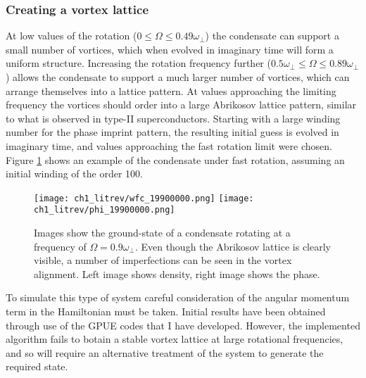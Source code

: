 \subsubsection{Creating a vortex lattice}
At low values of the rotation ($0 \leq \Omega \leq 0.49\omega_{\perp}$) the condensate can support a small number of vortices, which when evolved
in imaginary time will form a uniform structure. Increasing the rotation frequency further ($0.5\omega_{\perp} \leq \Omega \leq 0.89\omega_{\perp}$) allows the condensate to support a much larger number of vortices, which can arrange themselves into a lattice pattern. At values approaching the limiting frequency the vortices should order into a large Abrikosov lattice pattern, similar to what
is observed in type-II superconductors. Starting with a large winding number for the phase imprint pattern, the resulting initial guess is evolved in imaginary time, and values approaching the fast rotation limit were chosen. Figure \ref{fig:close_to_abrikosov} shows an example of the condensate under fast rotation, assuming an initial winding of the order 100.
 \begin{figure}[tb]
 \centering
 \texttt{[image: ch1\_litrev/wfc\_19900000.png]}
  \texttt{[image: ch1\_litrev/phi\_19900000.png]}
  \caption{Images show the ground-state of a condensate rotating at a frequency of $\Omega=0.9\omega_{\perp}$. Even though the Abrikosov lattice is clearly visible, a number of imperfections can be seen in the vortex alignment. Left image shows density, right image shows the phase.}
  \label{fig:close_to_abrikosov}
 \end{figure}
To simulate this type of system careful consideration of the angular momentum term in the Hamiltonian must be taken. Initial results have been obtained through use of the GPUE codes that I have developed. However,  the implemented algorithm fails to botain a stable vortex lattice at large rotational frequencies, and so will require an alternative treatment of the system to generate the required state.

